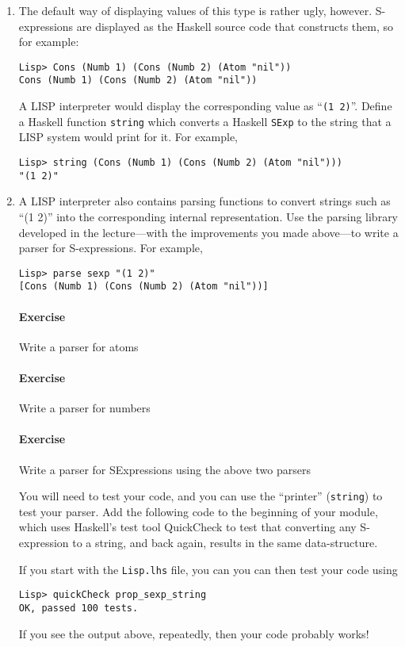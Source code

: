 \documentclass{article}
\newcommand{\percents}[1]{\protect \marginpar[l]{\bf [#1 points]}}
\newcounter{question}
\newcommand{\question}[2]{
  \addtocounter{question}{1}
  \paragraph{Exercise~\arabic{question}  \percents{#1}}
   #2
  \vfil
 }
\begin{document}
\begin{enumerate}
\item
The default way of displaying values of this type is rather ugly,
however. S-expressions are displayed as the Haskell source code that
constructs them, so for example:
\begin{verbatim}
Lisp> Cons (Numb 1) (Cons (Numb 2) (Atom "nil"))
Cons (Numb 1) (Cons (Numb 2) (Atom "nil"))
\end{verbatim}
A LISP interpreter would display the corresponding value as
``\verb!(1 2)!''. Define a Haskell function \verb!string! which
converts a Haskell \verb!SExp! to the string that a LISP system would
print for it. For example,
\begin{verbatim}
Lisp> string (Cons (Numb 1) (Cons (Numb 2) (Atom "nil")))
"(1 2)"
\end{verbatim}
\item
A LISP interpreter also contains parsing functions to convert strings
such as ``(1 2)'' into the corresponding internal representation. Use
the parsing library developed in the lecture---with the improvements
you made above---to write a parser for S-expressions. For example,
\begin{verbatim}
Lisp> parse sexp "(1 2)"
[Cons (Numb 1) (Cons (Numb 2) (Atom "nil"))]
\end{verbatim}

\question{1}{Write a parser for atoms}
\question{1}{Write a parser for numbers}
\question{3}{Write a parser for SExpressions using the above two parsers}

You will need to test your code, and you can use the ``printer''
(\verb!string!) to test your parser. Add the following code to the
beginning of your module, which uses Haskell's test tool QuickCheck to
test that converting any S-expression to a string, and back again,
results in the same data-structure. 

If you start with the \verb!Lisp.lhs! file, you can you can then test your code using

\begin{verbatim}
Lisp> quickCheck prop_sexp_string
OK, passed 100 tests.
\end{verbatim}
If you see the output above, repeatedly, then your code probably works!
\end{enumerate}
\end{document}
